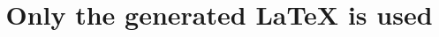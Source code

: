 \documentclass[a4paper]{article}
\begin{document}
\title{Only the generated \LaTeX{} is used}

\maketitle

% 
\end{document}
